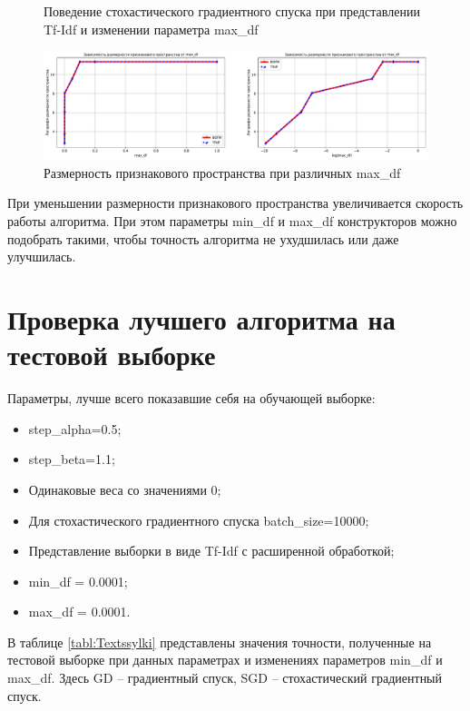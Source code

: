 \documentclass{article}
\begin{document}
\begin{itemize}
\begin{figure}[H]
	\caption{Поведение стохастического градиентного спуска при представлении Tf-Idf и изменении параметра max\_df}
	\label{fig:max_df_Tfidf_SGD}
\end{figure}
\begin{figure}[H]
	\centering
	\includegraphics[width=15cm]{TASK2 max_df size.pdf}
	\caption{Размерность признакового пространства при различных max\_df}
	\label{fig:max_df_size}
\end{figure}


\end{itemize}


При уменьшении размерности признакового пространства увеличивается скорость работы алгоритма. При этом параметры min\_df и max\_df конструкторов можно подобрать такими, чтобы точность алгоритма не ухудшилась или даже улучшилась.

\section{Проверка лучшего алгоритма на тестовой выборке}
Параметры, лучше всего показавшие себя на обучающей выборке:

\begin{itemize}
  \item step\_alpha=0.5;
  \item step\_beta=1.1;
   \item Одинаковые веса со значениями 0;
   \item Для стохастического градиентного спуска batch\_size=10000;
   \item Представление выборки в виде Tf-Idf с расширенной обработкой;
   \item min\_df = 0.0001;
   \item max\_df = 0.0001.
\end{itemize}

В таблице \ref{tabl:Textssylki} представлены значения точности, полученные на тестовой выборке при данных параметрах и изменениях параметров min\_df и max\_df. Здесь GD – градиентный спуск, SGD – стохастический градиентный спуск. 
\end{document}
